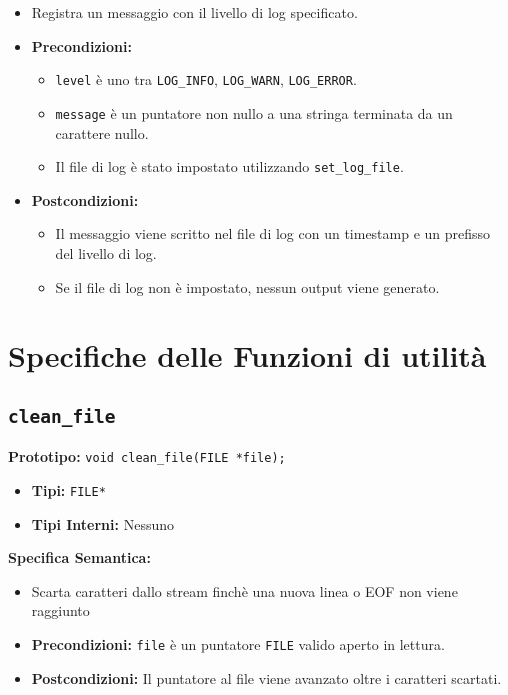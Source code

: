 \documentclass{article}
\begin{document}
\begin{itemize}[label=--,leftmargin=*]
    \item Registra un messaggio con il livello di log specificato.
    \item \textbf{Precondizioni:}
    \begin{itemize}[label=--,leftmargin=*]
        \item \texttt{level} è uno tra \texttt{LOG\_INFO}, \texttt{LOG\_WARN}, \texttt{LOG\_ERROR}.
        \item \texttt{message} è un puntatore non nullo a una stringa terminata da un carattere nullo.
        \item Il file di log è stato impostato utilizzando \texttt{set\_log\_file}.
    \end{itemize}
    \item \textbf{Postcondizioni:}
    \begin{itemize}[label=--,leftmargin=*]
        \item Il messaggio viene scritto nel file di log con un timestamp e un prefisso del livello di log.
        \item Se il file di log non è impostato, nessun output viene generato.
    \end{itemize}
\end{itemize}


\section{Specifiche delle Funzioni di utilità}
 \subsection{\texttt{clean\_file}}
\textbf{Prototipo:} \texttt{void clean\_file(FILE *file);}

\begin{itemize}[label=--,leftmargin=*]
    \item \textbf{Tipi:} \texttt{FILE*}
    \item \textbf{Tipi Interni:} Nessuno
\end{itemize}

\flushleft
\textbf{Specifica Semantica:}
\begin{itemize}[label=--,leftmargin=*]
    \item Scarta caratteri dallo stream finchè una nuova linea o EOF non viene raggiunto
    \item \textbf{Precondizioni:} \texttt{file} è un puntatore \texttt{FILE} valido aperto in lettura.
    \item \textbf{Postcondizioni:} Il puntatore al file viene avanzato oltre i caratteri scartati.
\end{itemize}
\end{document}
